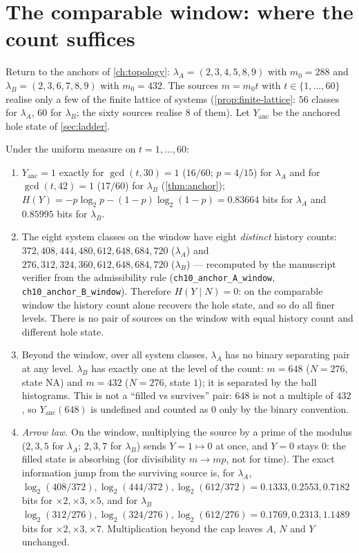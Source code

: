 \section{The comparable window: where the count suffices}\label{sec:window}
Return to the anchors of \cref{ch:topology}: $\lambda_A=(2,3,4,5,8,9)$ with $m_0=288$ and $\lambda_B=(2,3,6,7,8,9)$ with $m_0=432$. The sources $m=m_0t$ with $t\in\{1,\dots,60\}$ realise only a few of the finite lattice of systems (\cref{prop:finite-lattice}: $56$ classes for $\lambda_A$, $60$ for $\lambda_B$; the sixty sources realise $8$ of them). Let $Y_{\mathrm{anc}}$ be the anchored hole state of \cref{sec:ladder}.
\begin{observation}\label{obs:anchored}
Under the uniform measure on $t=1,\dots,60$:
\begin{enumerate}[label=(\roman*)]
\item $Y_{\mathrm{anc}}=1$ exactly for $\gcd(t,30)=1$ ($16/60$; $p=4/15$) for $\lambda_A$ and for $\gcd(t,42)=1$ ($17/60$) for $\lambda_B$ (\cref{thm:anchor}); $H(Y)=-p\log_2p-(1-p)\log_2(1-p)=0.83664$ bits for $\lambda_A$ and $0.85995$ bits for $\lambda_B$.
\item The eight system classes on the window have eight \emph{distinct} history counts: $372,408,444,480,612,648,684,720$ ($\lambda_A$) and $276,312,324,360,612,648,684,720$ ($\lambda_B$) --- recomputed by the manuscript verifier from the admissibility rule (\texttt{ch10\_anchor\_A\_window}, \texttt{ch10\_anchor\_B\_window}). Therefore $H(Y\mid N)=0$: on the comparable window the history count alone recovers the hole state, and so do all finer levels. There is no pair of sources on the window with equal history count and different hole state.
\item Beyond the window, over all system classes, $\lambda_A$ has no binary separating pair at any level. $\lambda_B$ has exactly one at the level of the count: $m=648$ ($N=276$, state $\mathrm{NA}$) and $m=432$ ($N=276$, state $1$); it is separated by the ball histograms. This is not a ``filled vs survives'' pair: $648$ is not a multiple of $432$, so $Y_{\mathrm{anc}}(648)$ is undefined and counted as $0$ only by the binary convention.
\item \emph{Arrow law.} On the window, multiplying the source by a prime of the modulus ($2,3,5$ for $\lambda_A$; $2,3,7$ for $\lambda_B$) sends $Y=1\mapsto0$ at once, and $Y=0$ stays $0$: the filled state is absorbing (for divisibility $m\to mp$, not for time). The exact information jump from the surviving source is, for $\lambda_A$, $\log_2(408/372),\log_2(444/372),\log_2(612/372)=0.1333,0.2553,0.7182$ bits for $\times2,\times3,\times5$, and for $\lambda_B$ $\log_2(312/276),\log_2(324/276),\log_2(612/276)=0.1769,0.2313,1.1489$ bits for $\times2,\times3,\times7$. Multiplication beyond the cap leaves $A$, $N$ and $Y$ unchanged.
\end{enumerate}
\end{observation}
